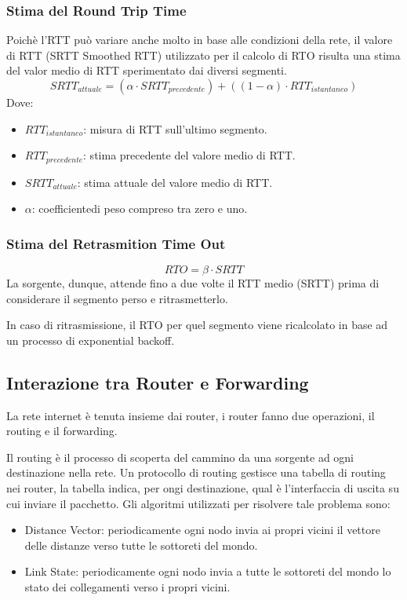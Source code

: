 \documentclass[oneside,a4paper,11pt]{book}
\theoremstyle{italicstyle}
\theoremstyle{normStyle}
\begin{document}
\subsubsection{Stima del Round Trip Time}
Poichè l'RTT può variare anche molto in base alle condizioni della rete, 
il valore di RTT (SRTT Smoothed RTT) utilizzato per il calcolo di RTO risulta una stima del valor medio 
di RTT sperimentato dai diversi segmenti.
\[
  SRTT_{attuale} = (\alpha \cdot SRTT_{precedente})+((1-\alpha)\cdot RTT_{istantaneo})
\]
Dove:
\begin{itemize}
  \item $RTT_{istantaneo}$: misura di RTT sull'ultimo segmento.
  \item $RTT_{precedente}$: stima precedente del valore medio di RTT.
  \item $SRTT_{attuale}$: stima attuale del valore medio di RTT.
  \item $\alpha$: coefficientedi peso compreso tra zero e uno.
\end{itemize}
\subsubsection{Stima del Retrasmition Time Out}
\[
  RTO = \beta \cdot SRTT
\]
La sorgente, dunque, attende fino a due volte il RTT medio (SRTT) 
prima di considerare il segmento perso e ritrasmetterlo.

In caso di ritrasmissione, il RTO per quel segmento viene ricalcolato
in base ad un processo di exponential backoff.
\subsection{Interazione tra Router e Forwarding}
La rete internet è tenuta insieme dai router, i router fanno
due operazioni, il routing e il forwarding.

Il routing è il processo di scoperta del cammino da una sorgente ad ogni destinazione
nella rete. Un protocollo di routing gestisce una tabella di routing nei router, la tabella
indica, per ongi destinazione, qual è l'interfaccia di uscita su cui inviare il pacchetto.
Gli algoritmi utilizzati per risolvere tale problema sono:
\begin{itemize}
  \item Distance Vector: periodicamente ogni nodo invia ai propri vicini il
  vettore delle distanze verso tutte le sottoreti del mondo.
  \item Link State: periodicamente ogni nodo invia a tutte le sottoreti 
  del mondo lo stato dei collegamenti verso i propri vicini.
\end{itemize}
\end{document}
